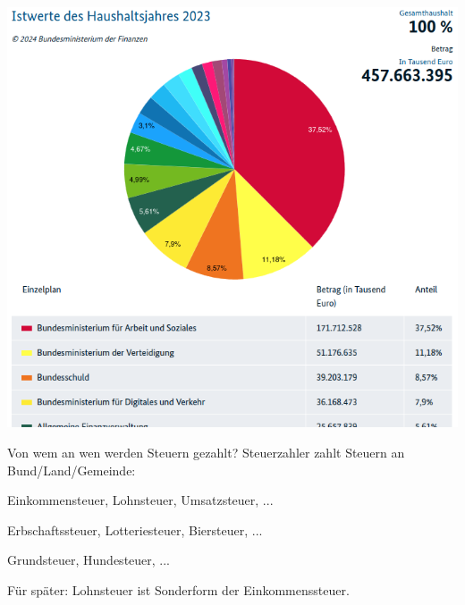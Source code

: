 \documentclass{beamer}
\begin{document}
			\begin{frame}
				\begin{center}
					\includegraphics[height=\textheight]{images/bundeshaushalt.png}
				\end{center}
			\end{frame}
		
			\begin{frame}{Von wem an wen werden Steuern gezahlt?}
				Steuerzahler zahlt Steuern an Bund/Land/Gemeinde:\n
				
				\begin{description}[An Gemeinde]
					\item[An Bund] Einkommensteuer, Lohnsteuer, Umsatzsteuer, ...
					\item[An Land] Erbschaftssteuer, Lotteriesteuer, Biersteuer, ...
					\item[An Gemeinde] Grundsteuer, Hundesteuer, ...
				\end{description}
				\n\pause
				Für später: Lohnsteuer ist Sonderform der Einkommenssteuer.
			\end{frame}
		
\end{document}
